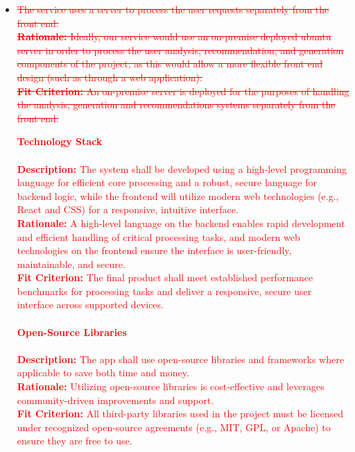 \documentclass[12pt]{article}
\begin{document}
\begin{itemize}
  \item \textcolor{red}{\sout{The service uses a server to process the user requests separately from the front end.}}
  \\ \textcolor{red}{\sout{\textbf{Rationale:} Ideally, our service would use an on-premise deployed ubuntu server in order to process the user 
  analysis, recommendation, and generation components of the project, as this would allow a more flexible front end design
  (such as through a web application). }}
  \\ \textcolor{red}{\sout{\textbf{Fit Criterion:} An on-premise server is deployed for the purposes of handling the analysis, generation and recommendations
  systems separately from the front end. }}


  \textcolor{red}{\textbf{Technology Stack}} \\
  \\ \textcolor{red}{\textbf{Description:} The system shall be developed using a high-level programming language for efficient core processing 
  and a robust, secure language for backend logic, while the frontend will utilize modern web technologies (e.g., React and CSS) 
  for a responsive, intuitive interface.}
  \\ \textcolor{red}{\textbf{Rationale:} A high-level language on the backend enables rapid development and efficient handling of critical 
  processing tasks, and modern web technologies on the frontend ensure the interface is user-friendly, maintainable, and secure.}
  \\ \textcolor{red}{\textbf{Fit Criterion:} The final product shall meet established performance benchmarks for processing tasks and deliver a responsive, 
  secure user interface across supported devices.}
  \\ \\

  \textcolor{red}{\textbf{Open-Source Libraries}} \\
  \\ \textcolor{red}{\textbf{Description:} The app shall use open-source libraries and frameworks where applicable to save both time and money.}
  \\ \textcolor{red}{\textbf{Rationale:} Utilizing open-source libraries is cost-effective and leverages community-driven improvements and support.}
  \\ \textcolor{red}{\textbf{Fit Criterion:} All third-party libraries used in the project must be licensed under recognized open-source agreements
  (e.g., MIT, GPL, or Apache) to ensure they are free to use.}
  \\ \\


\end{itemize}
\end{document}
